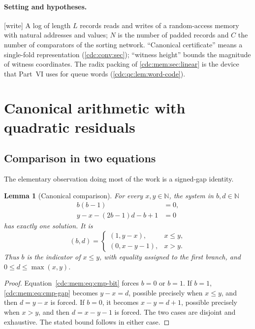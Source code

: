 \documentclass[11pt,a4paper]{article}
\newtheorem{lemma}[lemma]{Lemma}
\theoremstyle{definition}
\theoremstyle{remark}
\newcommand{\N}{\mathbb N}
\newcommand{\wtag}{\textup{[write]}}%
\newcommand{\srctag}[1]{\texorpdfstring{\hspace{0.5em}{\normalfont\small\color{accent}[#1]}}{ [#1]}}
\begin{document}
\paragraph{Setting and hypotheses.} \wtag{} A log of length $L$ records reads and writes of a random-access memory with natural addresses and values; $N$ is the number of padded records and $C$ the number of comparators of the sorting network. ``Canonical certificate'' means a single-fold representation (\cref{cdc:conv:sec}); ``witness height'' bounds the magnitude of witness coordinates. The radix packing of \cref{cdc:mem:sec:linear} is the device that Part~VI uses for queue words (\cref{cdc:qc:lem:word-code}).

\section{Canonical arithmetic with quadratic residuals\srctag{03}}\label{cdc:mem:sec:gadgets}
\subsection{Comparison in two equations}
The elementary observation doing most of the work is a signed-gap identity.

\begin{lemma}[Canonical comparison]\label{cdc:mem:lem:compare}
For every $x,y\in\N$, the system in $b,d\in\N$
\begin{align}
 b(b-1)&=0,\label{cdc:mem:eq:cmp-bit}\\
 y-x-(2b-1)d-b+1&=0\label{cdc:mem:eq:cmp-gap}
\end{align}
has exactly one solution. It is
\begin{equation}\label{cdc:mem:eq:cmp-sol}
 (b,d)=
 \begin{cases}
 (1,y-x),&x\leq y,\\
 (0,x-y-1),&x>y.
 \end{cases}
\end{equation}
Thus $b$ is the indicator of $x\leq y$, with equality assigned to the first
branch, and $0\leq d\leq\max(x,y)$.
\end{lemma}
\begin{proof}
Equation~\eqref{cdc:mem:eq:cmp-bit} forces $b=0$ or $b=1$. If $b=1$,
\eqref{cdc:mem:eq:cmp-gap} becomes $y-x=d$, possible precisely when $x\leq y$, and
then $d=y-x$ is forced. If $b=0$, it becomes $x-y=d+1$, possible precisely
when $x>y$, and then $d=x-y-1$ is forced. The two cases are disjoint and
exhaustive. The stated bound follows in either case.
\end{proof}
\end{document}
